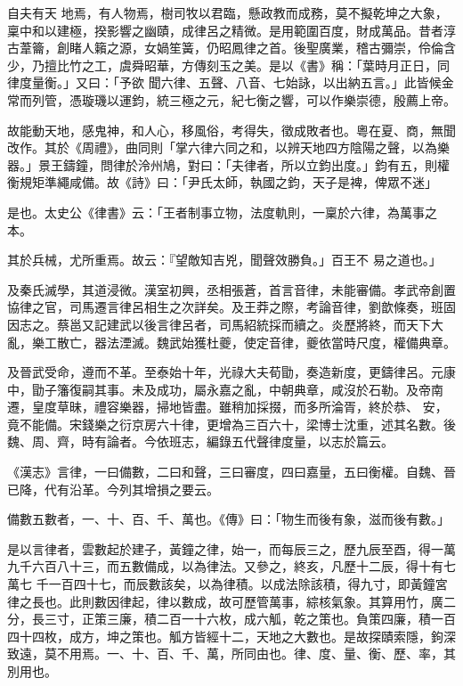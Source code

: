 
\begin{pinyinscope}

 自夫有天
 地焉，有人物焉，樹司牧以君臨，懸政教而成務，莫不擬乾坤之大象，稟中和以建極，揆影響之幽賾，成律呂之精微。是用範圍百度，財成萬品。昔者淳古葦籥，創睹人籟之源，女媧笙簧，仍昭鳳律之首。後聖廣業，稽古彌崇，伶倫含少，乃擅比竹之工，虞舜昭華，方傳刻玉之美。是以《書》稱：「葉時月正日，同律度量衡。」又曰：「予欲
 聞六律、五聲、八音、七始詠，以出納五言。」此皆候金常而列管，憑璇璣以運鈞，統三極之元，紀七衡之響，可以作樂崇德，殷薦上帝。



 故能動天地，感鬼神，和人心，移風俗，考得失，徵成敗者也。粵在夏、商，無聞改作。其於《周禮》，曲同則「掌六律六同之和，以辨天地四方陰陽之聲，以為樂器。」景王鑄鐘，問律於泠州鳩，對曰：「夫律者，所以立鈞出度。」鈞有五，則權衡規矩準繩咸備。故《詩》曰：「尹氏太師，執國之鈞，天子是裨，俾眾不迷」



 是也。太史公《律書》云：「王者制事立物，法度軌則，一稟於六律，為萬事之本。



 其於兵械，尤所重焉。故云：『望敵知吉兇，聞聲效勝負。」百王不
 易之道也。」



 及秦氏滅學，其道浸微。漢室初興，丞相張蒼，首言音律，未能審備。孝武帝創置協律之官，司馬遷言律呂相生之次詳矣。及王莽之際，考論音律，劉歆條奏，班固因志之。蔡邕又記建武以後言律呂者，司馬紹統採而續之。炎歷將終，而天下大亂，樂工散亡，器法湮滅。魏武始獲杜夔，使定音律，夔依當時尺度，權備典章。



 及晉武受命，遵而不革。至泰始十年，光祿大夫荀勖，奏造新度，更鑄律呂。元康中，勖子籓復嗣其事。未及成功，屬永嘉之亂，中朝典章，咸沒於石勒。及帝南遷，皇度草昧，禮容樂器，掃地皆盡。雖稍加採掇，而多所淪胥，終於恭、
 安，竟不能備。宋錢樂之衍京房六十律，更增為三百六十，梁博士沈重，述其名數。後魏、周、齊，時有論者。今依班志，編錄五代聲律度量，以志於篇云。



 《漢志》言律，一曰備數，二曰和聲，三曰審度，四曰嘉量，五曰衡權。自魏、晉已降，代有沿革。今列其增損之要云。



 備數五數者，一、十、百、千、萬也。《傳》曰：「物生而後有象，滋而後有數。」



 是以言律者，雲數起於建子，黃鐘之律，始一，而每辰三之，歷九辰至酉，得一萬九千六百八十三，而五數備成，以為律法。又參之，終亥，凡歷十二辰，得十有七萬七
 千一百四十七，而辰數該矣，以為律積。以成法除該積，得九寸，即黃鐘宮律之長也。此則數因律起，律以數成，故可歷管萬事，綜核氣象。其算用竹，廣二分，長三寸，正策三廉，積二百一十六枚，成六觚，乾之策也。負策四廉，積一百四十四枚，成方，坤之策也。觚方皆經十二，天地之大數也。是故探賾索隱，鉤深致遠，莫不用焉。一、十、百、千、萬，所同由也。律、度、量、衡、歷、率，其別用也。




\end{pinyinscope}
